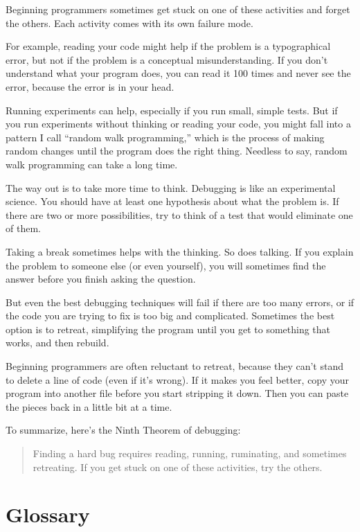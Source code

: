 \documentclass{book}
\begin{document}
Beginning programmers sometimes get stuck on one of these activities
and forget the others. Each activity comes with its own failure
mode.

For example, reading your code might help if the problem is a
typographical error, but not if the problem is a conceptual
misunderstanding. If you don't understand what your program does, you
can read it 100 times and never see the error, because the error is in
your head.

Running experiments can help, especially if you run small, simple
tests. But if you run experiments without thinking or reading your
code, you might fall into a pattern I call ``random walk programming,''
which is the process of making random changes until the program
does the right thing. Needless to say, random walk programming
can take a long time.

The way out is to take more time to think. Debugging is like an
experimental science. You should have at least one hypothesis about
what the problem is. If there are two or more possibilities, try to
think of a test that would eliminate one of them.

Taking a break sometimes helps with the thinking. So does talking.
If you explain the problem to someone else (or even yourself), you
will sometimes find the answer before you finish asking the question.

But even the best debugging techniques will fail if there are too many
errors, or if the code you are trying to fix is too big and
complicated. Sometimes the best option is to retreat, simplifying the
program until you get to something that works, and then rebuild.

Beginning programmers are often reluctant to retreat, because
they can't stand to delete a line of code (even if it's wrong).
If it makes you feel better, copy your program into another file
before you start stripping it down. Then you can paste the pieces
back in a little bit at a time.

To summarize, here's the Ninth Theorem of debugging:

\begin{quote}
Finding a hard bug requires reading, running, ruminating, and
sometimes retreating. If you get stuck on one of these activities,
try the others.
\end{quote}



\section{Glossary}
\end{document}
